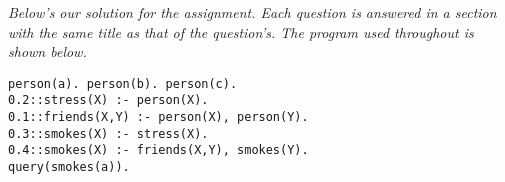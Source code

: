 \documentclass{res/theme}
\subtitle{Michiel Janssen \& Bruno Vandekerkhove}
\begin{document}
\maketitle

%
%
\begin{center}
\textit{Below's our solution for the assignment. Each question is answered in a section with the same title as that of the question's. The program used throughout is shown below.}
\end{center}

\vspace{0.5cm}
\begin{code}
\begin{verbatim}
person(a). person(b). person(c). 
0.2::stress(X) :- person(X). 
0.1::friends(X,Y) :- person(X), person(Y). 
0.3::smokes(X) :- stress(X). 
0.4::smokes(X) :- friends(X,Y), smokes(Y). 
query(smokes(a)).
\end{verbatim}
\label{code:base}
\end{code}
\vspace{0.5cm}
\begin{center}
\end{center}

\tableofcontents

%
% 


%
% 


%
% 


% 
%
%
%

%
%

%
\end{document}
